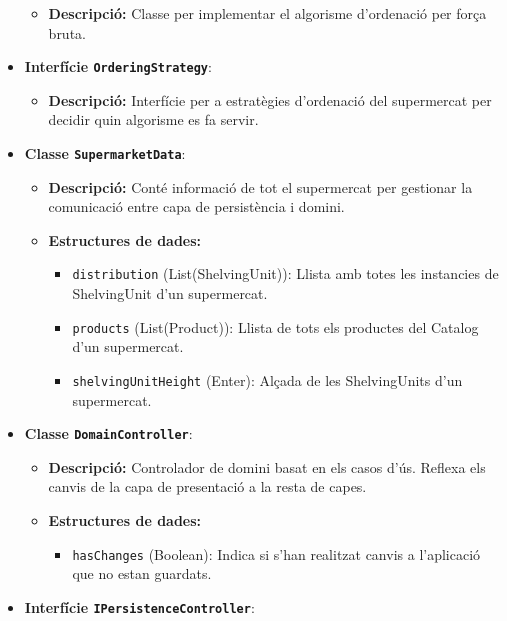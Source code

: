\documentclass[a4paper,12pt]{report}
\begin{document}
\begin{itemize}
	      \begin{itemize}
		      \item \textbf{Descripció:} Classe per implementar el algorisme d'ordenació per força bruta.
	      \end{itemize}
	\item \textbf{Interfície \texttt{OrderingStrategy}}:
	      \begin{itemize}
		      \item \textbf{Descripció:} Interfície per a estratègies d'ordenació del supermercat per decidir quin algorisme es fa servir.
	      \end{itemize}
	\item \textbf {Classe \texttt{SupermarketData}}:
	      \begin{itemize}
		      \item \textbf{Descripció:} Conté informació de tot el supermercat per gestionar la comunicació entre capa de persistència i domini. 
		      \item \textbf{Estructures de dades:}
		            \begin{itemize}
   			            \item \texttt{distribution} (List(ShelvingUnit)): Llista amb totes les instancies de ShelvingUnit d'un supermercat.
						\item \texttt{products} (List(Product)): Llista de tots els productes del Catalog d'un supermercat.
						\item \texttt{shelvingUnitHeight} (Enter): Alçada de les ShelvingUnits d'un supermercat.
						\end{itemize}
 	      \end{itemize}
	\item \textbf{Classe \texttt{DomainController}}:
		   \begin{itemize}
			   \item \textbf{Descripció:} Controlador de domini basat en els casos d'ús. Reflexa els canvis de la capa de presentació a la resta de capes.  
			   \item \textbf{Estructures de dades:}
 			   \begin{itemize}
				 \item \texttt{hasChanges} (Boolean): Indica si s'han realitzat canvis a l'aplicació que no estan guardats.
			   \end{itemize}
			\end{itemize}
	\item \textbf{Interfície \texttt{IPersistenceController}}:
	      \begin{itemize}

\end{itemize}
\end{itemize}
\end{document}
